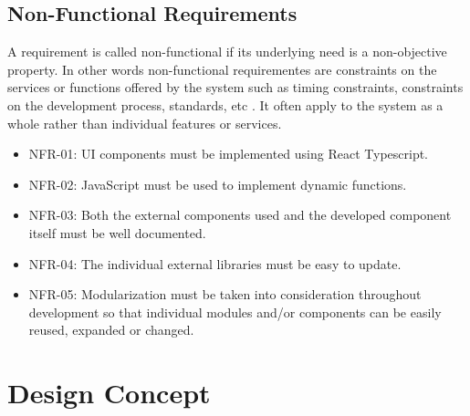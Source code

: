 \subsection{Non-Functional Requirements}
A requirement is called non-functional if its underlying need is a non-objective property. In other words non-functional requirementes are constraints on the services or functions offered by the system such as timing constraints, constraints on the development process, standards, etc \autocite{sommerville2011software}. It often apply to the system as a whole rather than individual features or services.

\begin{itemize}
  \item NFR-01: UI components must be implemented using React Typescript.
  \item NFR-02: JavaScript must be used to implement dynamic functions.
  \item NFR-03: Both the external components used and the developed component itself must be well documented.
  \item NFR-04: The individual external libraries must be easy to update.
  \item NFR-05: Modularization must be taken into consideration throughout development so that individual modules and/or components can be easily reused, expanded or changed.
\end{itemize}

\section{Design Concept}
